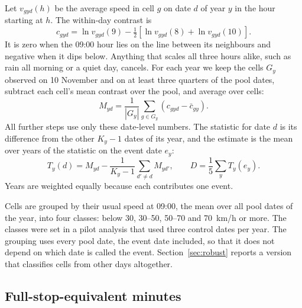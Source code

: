 \documentclass[11pt,a4paper]{article}
\begin{document}
Let $v_{gyd}(h)$ be the average speed in cell $g$ on date $d$ of year $y$ in the hour starting at
$h$. The within-day contrast is
\begin{equation}
c_{gyd} = \ln v_{gyd}(9) - \tfrac12\left[\ln v_{gyd}(8) + \ln v_{gyd}(10)\right].
\end{equation}
It is zero when the 09:00 hour lies on the line between its neighbours and negative when it dips
below. Anything that scales all three hours alike, such as rain all morning or a quiet day, cancels.
For each year we keep the cells $G_y$ observed on 10 November and on at least three quarters of the
pool dates, subtract each cell's mean contrast over the pool, and average over cells:
\begin{equation}
M_{yd} = \frac{1}{|G_y|}\sum_{g \in G_y} \left(c_{gyd} - \bar c_{gy}\right).
\end{equation}
All further steps use only these date-level numbers. The statistic for date $d$ is its difference
from the other $K_y - 1$ dates of its year, and the estimate is the mean over years of the statistic
on the event date $e_y$:
\begin{equation}
T_y(d) = M_{yd} - \frac{1}{K_y-1}\sum_{d' \neq d} M_{yd'}, \qquad
D = \frac{1}{5}\sum_{y} T_y(e_y).
\end{equation}
Years are weighted equally because each contributes one event.

Cells are grouped by their usual speed at 09:00, the mean over all pool dates of the year, into four
classes: below 30, 30--50, 50--70 and 70~km/h or more. The classes were set in a pilot analysis that
used three control dates per year. The grouping uses every pool date, the event date included, so
that it does not depend on which date is called the event. Section~\ref{sec:robust} reports a version
that classifies cells from other days altogether.

\subsection{Full-stop-equivalent minutes}\label{sec:minutes}
\end{document}
